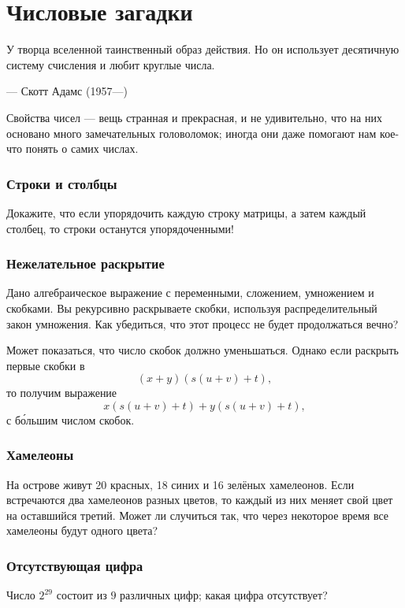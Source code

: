 \chapter{Числовые загадки}


\setlength{\epigraphwidth}{.85\textwidth}
\epigraph{У творца вселенной таинственный образ действия.
Но он использует десятичную систему счисления и любит круглые
числа.
}{--- Скотт Адамс (1957---)}


Свойства чисел --- вещь странная и прекрасная, и не удивительно, что на них основано много замечательных головоломок; иногда они даже помогают нам кое-что понять о самих числах.

\subsection*{Строки и столбцы}

Докажите, что если упорядочить каждую строку матрицы, а затем каждый столбец, то строки останутся упорядоченными!

\subsection*{Нежелательное раскрытие}

Дано алгебраическое выражение с переменными, сложением, умножением и скобками.
Вы рекурсивно раскрываете скобки, используя распределительный закон умножения.
Как убедиться, что этот процесс не будет продолжаться вечно?

Может показаться, что число скобок должно уменьшаться.
Однако если раскрыть первые скобки в
\[(x + y)(s(u + v) + t),\]
то получим выражение
\[x(s(u + v) + t) + y(s(u + v) + t),\]
с б\'{о}льшим числом скобок.

\subsection*{Хамелеоны}

На острове живут 20 красных, 18 синих и 16 зелёных хамелеонов.
Если встречаются два хамелеонов разных цветов, то каждый из них меняет свой цвет на оставшийся третий.
Может ли случиться так, что через некоторое время все хамелеоны будут одного цвета? 

\subsection*{Отсутствующая цифра}

Число $2^{29}$ состоит из $9$ различных цифр; какая цифра отсутствует?

